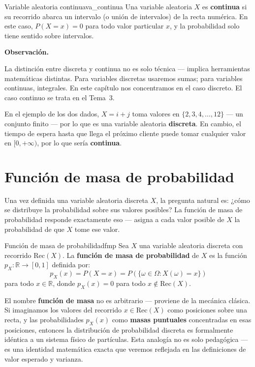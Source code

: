 \documentclass[12pt, a4paper]{book}
\newenvironment{observacion}{%
    \par\medskip\noindent\textbf{\color{azul}Observaci\'{o}n.}\enspace\itshape
}{\par\medskip}
\numberwithin{equation}{chapter}
\begin{document}
\begin{definicion}{Variable aleatoria continua}{va_continua}
	Una variable aleatoria $X$ es \textbf{continua} si su recorrido 
	abarca un intervalo (o unión de intervalos) de la recta numérica. 
	En este caso, $P(X = x) = 0$ para todo valor particular $x$, y la 
	probabilidad solo tiene sentido sobre intervalos.
\end{definicion}

\begin{observacion}
	La distinción entre discreta y continua no es solo técnica — 
	implica herramientas matemáticas distintas. Para variables discretas 
	usaremos sumas; para variables continuas, integrales. En este 
	capítulo nos concentramos en el caso discreto. El caso continuo se 
	trata en el Tema~3.
\end{observacion}

En el ejemplo de los dos dados, $X = i+j$ toma valores en 
$\{2, 3, 4, \ldots, 12\}$ — un conjunto finito — por lo que es una 
variable aleatoria \textbf{discreta}. En cambio, el tiempo de espera 
hasta que llega el próximo cliente puede tomar cualquier valor en 
$[0, +\infty)$, por lo que sería \textbf{continua}.


\section{Funci\'{o}n de masa de probabilidad}

Una vez definida una variable aleatoria discreta $X$, la pregunta 
natural es: ¿cómo se distribuye la probabilidad sobre sus valores 
posibles? La función de masa de probabilidad responde 
exactamente eso — asigna a cada valor posible de $X$ la probabilidad 
de que $X$ tome ese valor.

\begin{definicion}{Función de masa de probabilidad}{fmp}
	Sea $X$ una variable aleatoria discreta con recorrido 
	$\text{Rec}(X)$. La \textbf{función de masa de probabilidad} 
	 de $X$ es 
	la función $p_X : \mathbb{R} \to [0,1]$ definida por:
	\[
	p_X(x) = P(X = x) = P(\{\omega \in \Omega : X(\omega) = x\})
	\]
	para todo $x \in \mathbb{R}$, donde $p_X(x) = 0$ para todo 
	$x \notin \text{Rec}(X)$.
\end{definicion}

El nombre \textbf{función de masa} no es arbitrario — proviene de la 
mecánica clásica. Si imaginamos los valores del recorrido $x \in 
\text{Rec}(X)$ como posiciones sobre una recta, y las probabilidades 
$p_X(x)$ como \textbf{masas puntuales} concentradas en esas posiciones, 
entonces la distribución de probabilidad discreta es formalmente 
idéntica a un sistema físico de partículas. Esta analogía no es solo 
pedagógica — es una identidad matemática exacta que veremos reflejada 
en las definiciones de valor esperado y varianza.
\end{document}
